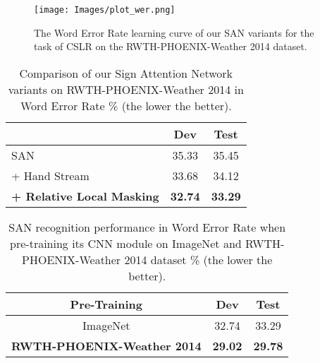 \documentclass[a4paper,conference]{IEEEtran}
\begin{document}
\begin{figure}[t]
    \centering
    \texttt{[image: Images/plot\_wer.png]}

    \caption{The Word Error Rate learning curve of our SAN variants for the task of CSLR on the RWTH-PHOENIX-Weather 2014 dataset.}
    \label{fig:learning_curve}
\end{figure}

\begin{table}[t!]
\begin{center}

\setlength{\tabcolsep}{10pt}

\caption{Comparison of our Sign Attention Network variants on RWTH-PHOENIX-Weather 2014 in Word Error Rate \% (the lower the better).}
\label{table:t2}
\begin{tabular}{l | c c}
& Dev & Test
\\

\hline

SAN & 35.33 & 35.45 \\

+ Hand Stream & 33.68 & 34.12 \\

\textbf{+ Relative Local Masking} & \textbf{32.74} & \textbf{33.29} \\

\hline
\end{tabular}
\end{center}
\vskip -0.2in \end{table}






\begin{table}[t!]
\begin{center}

\setlength{\tabcolsep}{10pt}

\caption{SAN recognition performance in Word Error Rate when pre-training its CNN module on ImageNet and RWTH-PHOENIX-Weather 2014 dataset \% (the lower the better).}
\label{table:t_pretraining}
\begin{tabular}{c | c c}
Pre-Training & Dev & Test
\\

\hline

ImageNet & 32.74 & 33.29 \\

\textbf{RWTH-PHOENIX-Weather 2014} & \textbf{29.02} & \textbf{29.78} \\

\hline
\end{tabular}
\end{center}
\vskip -0.2in \end{table}
\end{document}
